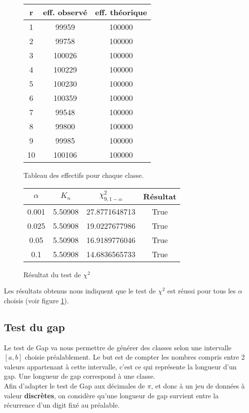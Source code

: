\documentclass[10pt,a4paper]{article}
\begin{document}
\begin{figure}[H]
\begin{center}
\begin{longtable}{|c|c|c|}
\hline
r & eff. observé & eff. théorique\\
\hline
1 & 99959 & 100000\\
2 & 99758 & 100000\\
3 & 100026 & 100000\\
4 & 100229 & 100000\\
5 & 100230 & 100000\\
6 & 100359 & 100000\\
7 & 99548 & 100000\\
8 & 99800 & 100000\\
9 & 99985 & 100000\\
10 & 100106 & 100000\\
\hline
\end{longtable}
\end{center}
\caption{Tableau des effectifs pour chaque classe.}
\end{figure}
\begin{figure}[H]
\begin{center}
\begin{tabular}{|c|c|c|c|}
\hline
$\alpha$ & $K_{n}$ & $\chi^2_{9, 1 - \alpha}$ & Résultat\\
\hline
0.001 & 5.50908 & 27.8771648713 & True\\
0.025 & 5.50908 & 19.0227677986 & True\\
0.05 & 5.50908 & 16.9189776046 & True\\
0.1 & 5.50908 & 14.6836565733 & True\\
\hline
\end{tabular}
\end{center}
\caption{Résultat du test de $\chi^2$}
\label{result1}
\end{figure}

Les résultats obtenus nous indiquent que le test de $\chi^2$ est réussi pour tous les $\alpha$ choisis (voir figure \ref{result1}).
\subsection{Test du gap}

Le test de Gap va nous permettre de générer des classes selon une intervalle $[a, b]$ choisie préalablement. Le but est de compter les nombres compris entre 2 valeurs appartenant à cette intervalle, c'est ce qui représente la longueur d'un gap. Une longueur de gap correspond à une classe.\\
Afin d'adapter le test de Gap aux décimales de $\pi$, et donc à un jeu de données à valeur \textbf{discrètes}, on considère qu'une longueur de gap survient entre la récurrence d'un digit fixé au préalable.\\
\end{document}

